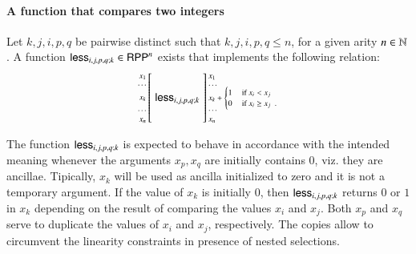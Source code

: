 \paragraph{A function that compares two integers}
Let $k,j,i, p,q$ be pairwise distinct such that $k,j,i, p,q \leq n$, for a given arity $ n\in\mathbb{N} $.
A function $ \mathsf{less}_{i,j,p,q;k}\in\mathsf{RPP}^n $ exists that implements the following relation:
\begin{align*}
\arraycolsep=1.4pt
\begin{array}{rcl}
  \left. {\scriptsize 
          \begin{array}{r} 
             x_1\\ \cdots 
             \\[1.10mm]
             x_k
             \\[1.25mm] 
             \cdots \\
             x_n
          \end{array}} 
  \right[
 & \rprLess_{i,j,p,q;k} &
   \left] {\scriptsize 
          \begin{array}{l}
             x_1\\ \cdots 
           \\[-1mm]
            x_k
            + \begin{cases}
                1 & \textrm{ if } x_i <    x_j\\
                0 & \textrm{ if }      x_i \geq x_j
                \enspace .
            \end{cases}
           \\[-1.10mm]
           \cdots \\ x_n
          \end{array} 
           } 
   \right.
\end{array}
\end{align*}

The function $\mathsf{less}_{i,j,p,q;k}$ is expected to behave in accordance with the intended meaning whenever the 
arguments $ x_p, x_q $ are initially contains $0$, viz. they are ancillae.
Tipically, $x_k$ will be used as ancilla initialized to zero and it is not a temporary argument.
If the value of $x_k$ is initially $ 0 $, then $\mathsf{less}_{i,j,p,q;k}$ returns  $ 0 $ or $ 1 $ in $ x_k $ 
depending on the result of comparing the values $ x_i $ and $ x_j $.  
Both $x_p$ and $x_q$ serve to duplicate the values of $x_i$ and $x_j$, respectively.
The copies allow to circumvent the linearity constraints in presence of nested selections.

